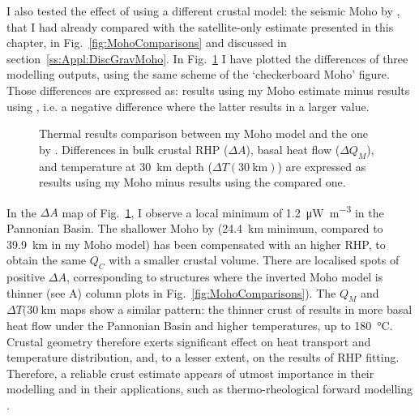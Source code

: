 I also tested the effect of using a different crustal model: the seismic Moho by \textcite{Grad2009}, that I had already compared with the satellite-only estimate presented in this chapter, in Fig.~\ref{fig:MohoComparisons} and discussed in section~\ref{ss:Appl:DiscGravMoho}.
In Fig.~\ref{fig:CompGradMoho} I have plotted the differences of three modelling outputs, using the same scheme of the `checkerboard Moho' figure.
Those differences are expressed as: results using my Moho estimate minus results using \textcite{Grad2009}, i.e. a negative difference where the latter results in a larger value.

\begin{figure}
	\begin{adjustbox}{center}
	\end{adjustbox}
	\caption[Thermal results comparison between my Moho model and the one by \textcite{Grad2009}.]{Thermal results comparison between my Moho model and the one by \textcite{Grad2009}. Differences in bulk crustal RHP ($\Delta A$), basal heat flow ($\Delta Q_M$), and temperature at 30~\si{\kilo \metre} depth ($\Delta T(30~\mathrm{km})$) are expressed as results using my Moho minus results using the compared one.}
	\label{fig:CompGradMoho}
\end{figure}

In the $\Delta A$ map of Fig.~\ref{fig:CompGradMoho}, I observe a local minimum of \SI{1.2}{\micro \watt \per \cubic \metre} in the Pannonian Basin.
The shallower Moho by \textcite{Grad2009} (24.4~\si{\kilo \metre} minimum, compared to 39.9~\si{\kilo \metre} in my Moho model) has been compensated with an higher RHP, to obtain the same $Q_C$ with a smaller crustal volume.
There are localised spots of positive $\Delta A$, corresponding to structures where the inverted Moho model is thinner (see A) column plots in Fig.~\ref{fig:MohoComparisons}).
The $Q_M$ and $\Delta T(30~\mathrm{km}$ maps show a similar pattern: the thinner crust of \textcite{Grad2009} results in more basal heat flow under the Pannonian Basin and higher temperatures, up to \SI[retain-explicit-plus]{+180}{\celsius}.
Crustal geometry therefore exerts significant effect on heat transport and temperature distribution, and, to a lesser extent, on the results of RHP fitting.
Therefore, a reliable crust estimate appears of utmost importance in their modelling and in their applications, such as thermo-rheological forward modelling \parencite[e.g. ][]{Burov1995}.

